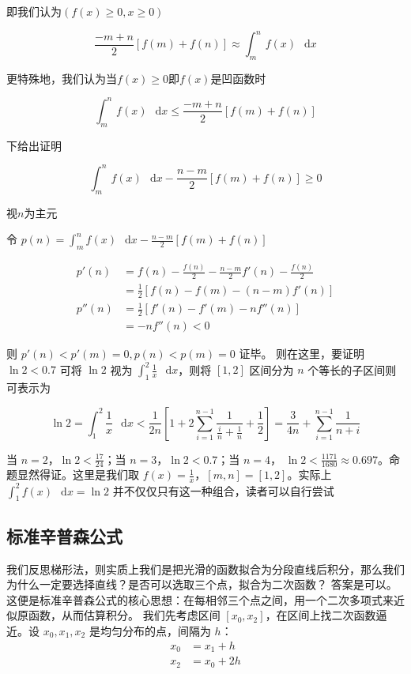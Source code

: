 \documentclass[12pt]{article}
\theoremstyle{definition}
\theoremstyle{plain}
\theoremstyle{definition}
\newcommand{\diff}{\mathop{}\!\mathrm{d}}
\begin{document}
即我们认为\(\left( f(x) \geq 0,x \geq 0 \right)\)

\[\frac{- m + n}{2}\left\lbrack f(m) + f(n) \right\rbrack \approx \int_{m}^{n}f(x)\,\diff x\]

更特殊地，我们认为当\(f(x) \geq 0\)即\(f(x)\)是凹函数时

\[\int_{m}^{n}f(x)\,\diff x \leq \frac{- m + n}{2}\left\lbrack f(m) + f(n) \right\rbrack\]

下给出证明

\[\int_{m}^{n}f(x)\,\diff x - \frac{n - m}{2}\left\lbrack f(m) + f(n) \right\rbrack \geq 0\]

视\(n\)为主元

令
\(p(n) = \int_{m}^{n}f(x)\,\diff x - \frac{n - m}{2}\left\lbrack f(m) + f(n) \right\rbrack\)

\begin{align*}
p'(n) &= f(n) - \frac{f(n)}{2} - \frac{n - m}{2}f'(n) - \frac{f(n)}{2} \\
&= \frac{1}{2}\left\lbrack f(n) - f(m) - (n - m)f'(n) \right\rbrack \\
p''(n) &= \frac{1}{2}\left\lbrack f'(n) - f'(m) - nf''(n) \right\rbrack \\
&= -nf''(n) < 0
\end{align*}

则 \(p'(n) < p'(m) = 0,p(n) < p(m) = 0\) 证毕。 则在这里，要证明
\(\ln 2 < 0.7\) 可将 \(\ln 2\) 视为 \(\int_{1}^{2}\frac{1}{x}\,\diff x\)，则将
\([1, 2]\) 区间分为 $n$ 个等长的子区间则可表示为

\[\ln 2 = \int_{1}^{2}\frac{1}{x}\,\diff x < \frac{1}{2n}\left\lbrack 1 + 2\sum_{i = 1}^{n - 1}\frac{1}{\frac{i}{n} + \frac{1}{n}} + \frac{1}{2} \right\rbrack = \frac{3}{4n} + \sum_{i = 1}^{n - 1}\frac{1}{n + i}\]

当 \(n = 2\)，\(\ln 2 < \frac{17}{24}\)；当 \(n = 3\)，\(\ln 2 < 0.7\)；当 \(n = 4\)，
\(\ln 2 < \frac{1171}{1680} \approx 0.697\)。命题显然得证。这里是我们取
\(f(x) = \frac{1}{x}\)，\([m, n] = [1, 2]\)。实际上
\(\int_{1}^{2}f(x)\,\diff x = \ln 2\) 并不仅仅只有这一种组合，读者可以自行尝试

\subsection{标准辛普森公式}

我们反思梯形法，则实质上我们是把光滑的函数拟合为分段直线后积分，那么我们为什么一定要选择直线？是否可以选取三个点，拟合为二次函数？
答案是可以。这便是标准辛普森公式的核心思想：在每相邻三个点之间，用一个二次多项式来近似原函数，从而估算积分。
我们先考虑区间 \([x_0, x_2]\)，在区间上找二次函数逼近。设 \(x_0, x_1, x_2\)
是均匀分布的点，间隔为 \(h\)：
\begin{align*}
x_{0} &= x_{1} + h \\
x_{2} &= x_{0} + 2h
\end{align*}
\end{document}
